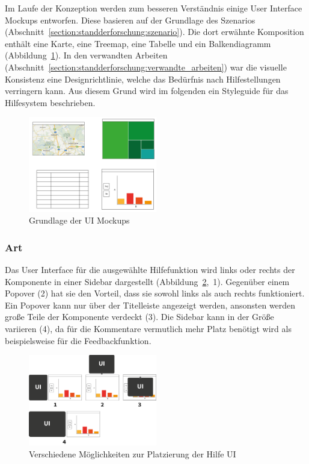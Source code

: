 \documentclass[
	headsepline,
	footsepline,
	fontsize=12pt,
	bibliography=totoc
]{scrbook}
\begin{document}
Im Laufe der Konzeption werden zum besseren Verständnis einige User Interface Mockups entworfen. Diese basieren auf der Grundlage des Szenarios (Abschnitt~\ref{section:standderforschung:szenario}). Die dort erwähnte Komposition enthält eine Karte, eine Treemap, eine Tabelle und ein Balkendiagramm (Abbildung~\ref{figure:ui-grundlage}). In den verwandten Arbeiten (Abschnitt~\ref{section:standderforschung:verwandte_arbeiten}) war die visuelle Konsistenz eine Designrichtlinie, welche das Bedürfnis nach Hilfestellungen verringern kann. Aus diesem Grund wird im folgenden ein Styleguide für das Hilfesystem beschrieben.

\begin{figure}[htbp]
   \centering
   \includegraphics[width=0.5\textwidth]{images/konzeption-ui-grundlage.png}
   \caption{Grundlage der UI Mockups}
   \label{figure:ui-grundlage}
\end{figure}

\subsubsection{Art}


Das User Interface für die ausgewählte Hilfefunktion wird links oder rechts der Komponente in einer Sidebar dargestellt (Abbildung~\ref{figure:ui-basics},~1). Gegenüber einem Popover (2) hat sie den Vorteil, dass sie sowohl links als auch rechts funktioniert. Ein Popover kann nur über der Titelleiste angezeigt werden, ansonsten werden große Teile der Komponente verdeckt (3). Die Sidebar kann in der Größe variieren (4), da für die Kommentare vermutlich mehr Platz benötigt wird als beispielsweise für die Feedbackfunktion.

\begin{figure}[htbp]
   \centering
   \includegraphics[width=0.5\textwidth]{images/konzeption-ui-basics.png}
   \caption{Verschiedene Möglichkeiten zur Platzierung der Hilfe UI}
   \label{figure:ui-basics}
\end{figure}
\end{document}
